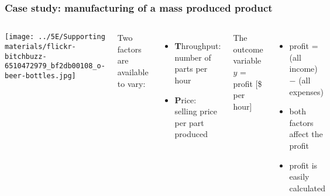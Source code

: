 \begin{frame}\frametitle{Case study: manufacturing of a mass produced product}
	\begin{columns}[c]
				\centerline{\texttt{[image: ../5E/Supporting materials/flickr-bitchbuzz-6510472979\_bf2db00108\_o-beer-bottles.jpg]}}
			Two factors are available to vary:
			\begin{itemize}
				

				\item	\textbf{T}hroughput: number of parts per hour
				\item	\textbf{P}rice: selling price per part produced
			\end{itemize}
			
			\vspace{1cm}
			\pause
			The outcome variable $y$ = profit [\$ per hour]
			
			\begin{itemize}
				\item	profit = (all income) $-$ (all expenses) \pause
				\item	both factors affect the profit \pause
				\item	profit is easily calculated \pause
			\end{itemize}
	\end{columns}
\end{frame}

